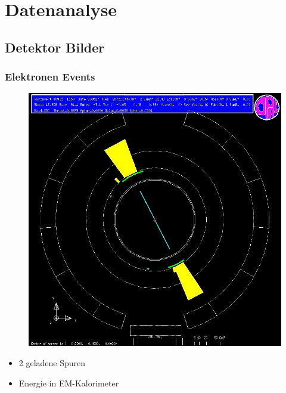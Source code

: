 \section{Datenanalyse}
\subsection{Detektor Bilder}
\begin{frame}
	\frametitle{Elektronen Events}
	\begin{minipage}{0.54\linewidth}
		\begin{figure}
			\centering
			\includegraphics[width=1.0\linewidth]{graphics/electronopal}
		\end{figure}
	\end{minipage}
	\begin{minipage}{0.44\linewidth}
		\begin{center}
			\begin{itemize}
				\item 2 geladene Spuren\\\hfill
				\item Energie in EM-Kalorimeter\\\hfill
			\end{itemize}
		\end{center}
	\end{minipage}
\end{frame}


